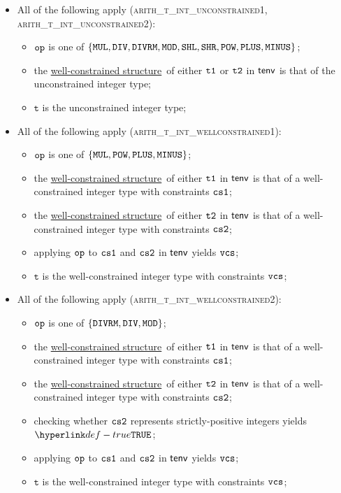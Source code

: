\documentclass{book}
\newcommand\ProseOrTypeError[0]{\ProseTerminateAs{\TypeErrorConfig}}
\newcommand\wellconstrainedstructure[0]{\hyperlink{def-getwellconstrainedstructure}{well-constrained structure}}
\newcommand\vt[0]{\texttt{t}}
\begin{document}
\begin{itemize}
  \item All of the following apply (\textsc{arith\_t\_int\_unconstrained1}, \\
                                    \textsc{arith\_t\_int\_unconstrained2}):
  \begin{itemize}
    \item $\texttt{op}$ is one of $\{\texttt{MUL}, \texttt{DIV}, \texttt{DIVRM}, \texttt{MOD}, \texttt{SHL},  \texttt{SHR}, \texttt{POW}, \texttt{PLUS}, \texttt{MINUS}\}$;
    \item the \wellconstrainedstructure\ of either $\texttt{t1}$ or $\texttt{t2}$ in $\textsf{tenv}$ is that of the unconstrained integer type;
    \item $\vt$ is the unconstrained integer type;
  \end{itemize}

  \item All of the following apply (\textsc{arith\_t\_int\_wellconstrained1}):
  \begin{itemize}
    \item $\texttt{op}$ is one of $\{\texttt{MUL}, \texttt{POW}, \texttt{PLUS}, \texttt{MINUS}\}$;
    \item the \wellconstrainedstructure\ of either $\texttt{t1}$ in $\textsf{tenv}$ is that of a well-constrained integer type with
          constraints $\texttt{cs1}$;
          \item the \wellconstrainedstructure\ of either $\texttt{t2}$ in $\textsf{tenv}$ is that of a well-constrained integer type with
          constraints $\texttt{cs2}$;
    \item applying $\texttt{op}$ to $\texttt{cs1}$ and $\texttt{cs2}$ in $\textsf{tenv}$ yields $\texttt{vcs}$;
    \item $\vt$ is the well-constrained integer type with constraints $\texttt{vcs}$;
  \end{itemize}

  \item All of the following apply (\textsc{arith\_t\_int\_wellconstrained2}):
  \begin{itemize}
    \item $\texttt{op}$ is one of $\{\texttt{DIVRM}, \texttt{DIV}, \texttt{MOD}\}$;
    \item the \wellconstrainedstructure\ of either $\texttt{t1}$ in $\textsf{tenv}$ is that of a well-constrained integer type with
          constraints $\texttt{cs1}$;
          \item the \wellconstrainedstructure\ of either $\texttt{t2}$ in $\textsf{tenv}$ is that of a well-constrained integer type with
          constraints $\texttt{cs2}$;
    \item checking whether $\texttt{cs2}$ represents strictly-positive integers yields $\True$\ProseOrTypeError;
    \item applying $\texttt{op}$ to $\texttt{cs1}$ and $\texttt{cs2}$ in $\textsf{tenv}$ yields $\texttt{vcs}$;
    \item $\vt$ is the well-constrained integer type with constraints $\texttt{vcs}$;
  \end{itemize}


\end{itemize}
\end{document}

